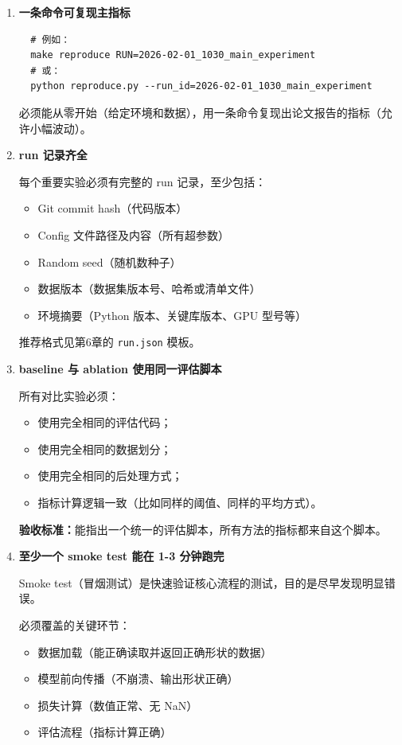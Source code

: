 \begin{enumerate}
  \item \textbf{一条命令可复现主指标}
  \begin{verbatim}
  # 例如：
  make reproduce RUN=2026-02-01_1030_main_experiment
  # 或：
  python reproduce.py --run_id=2026-02-01_1030_main_experiment
  \end{verbatim}
  必须能从零开始（给定环境和数据），用一条命令复现出论文报告的指标（允许小幅波动）。

  \item \textbf{run 记录齐全}

  每个重要实验必须有完整的 run 记录，至少包括：
  \begin{itemize}
    \item Git commit hash（代码版本）
    \item Config 文件路径及内容（所有超参数）
    \item Random seed（随机数种子）
    \item 数据版本（数据集版本号、哈希或清单文件）
    \item 环境摘要（Python 版本、关键库版本、GPU 型号等）
  \end{itemize}

  推荐格式见第6章的 \texttt{run.json} 模板。

  \item \textbf{baseline 与 ablation 使用同一评估脚本}

  所有对比实验必须：
  \begin{itemize}
    \item 使用完全相同的评估代码；
    \item 使用完全相同的数据划分；
    \item 使用完全相同的后处理方式；
    \item 指标计算逻辑一致（比如同样的阈值、同样的平均方式）。
  \end{itemize}

  \textbf{验收标准：}能指出一个统一的评估脚本，所有方法的指标都来自这个脚本。

  \item \textbf{至少一个 smoke test 能在 1-3 分钟跑完}

  Smoke test（冒烟测试）是快速验证核心流程的测试，目的是尽早发现明显错误。

  必须覆盖的关键环节：
  \begin{itemize}
    \item 数据加载（能正确读取并返回正确形状的数据）
    \item 模型前向传播（不崩溃、输出形状正确）
    \item 损失计算（数值正常、无 NaN）
    \item 评估流程（指标计算正确）
  \end{itemize}


\end{enumerate}
